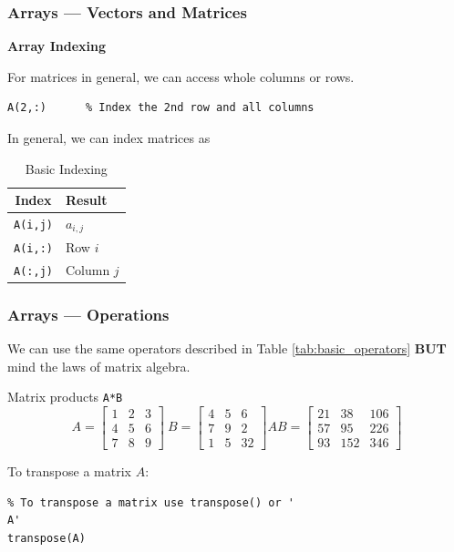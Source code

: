 \documentclass[11pt,xcolor={svgnames},aspectratio=169,usepdftitle=false]{beamer}
\let\toneitemize\itemize
\let\ttwoitemize\enditemize
\renewenvironment{itemize}{\toneitemize\addtolength{\itemsep}{1.35\baselineskip}}{\ttwoitemize}
\begin{document}
\begin{frame}[fragile]
    \frametitle{Arrays --- Vectors and Matrices}
\alert{\textbf{Array Indexing}}
    \begin{itemize}
        \item For matrices in general, we can access whole columns or rows.
\begin{lstlisting}
A(2,:)      % Index the 2nd row and all columns
\end{lstlisting}
        \item In general, we can index matrices as
    \end{itemize}
    \begin{table}[htbp]
        \caption{Basic Indexing}
        \label{tab:basic_indexing}
        \begin{tabular}{@{}cl@{}}
        \toprule
        Index & Result \\ \midrule
        \verb+A(i,j)+  & $a_{i,j}$ \\ 
        \verb+A(i,:)+  & Row $i$ \\ 
        \verb+A(:,j)+  & Column $j$ \\ \bottomrule
        \end{tabular}
    \end{table}
\end{frame}

\begin{frame}[fragile]
    \frametitle{Arrays --- Operations}
    \begin{itemize}
        \item We can use the same operators described in Table \ref{tab:basic_operators} \alert{\textbf{BUT}} mind the laws of matrix algebra.
        \item Matrix products \verb+A*B+
        \[
        A = \begin{bmatrix}
            1 & 2 & 3 \\
            4 & 5 & 6 \\
            7 & 8 & 9 
            \end{bmatrix} \ 
        B = \begin{bmatrix}
            4 & 5 & 6 \\
            7 & 9 & 2 \\
            1 & 5 & 32
            \end{bmatrix}
        AB = \begin{bmatrix}
            21 & 38 & 106 \\
            57 & 95 & 226 \\
            93 & 152 & 346
        \end{bmatrix} 
        \]
        \item To transpose a matrix $A$:
\begin{lstlisting}
% To transpose a matrix use transpose() or '
A'
transpose(A)
\end{lstlisting}
    \end{itemize}
\end{frame}
\end{document}
